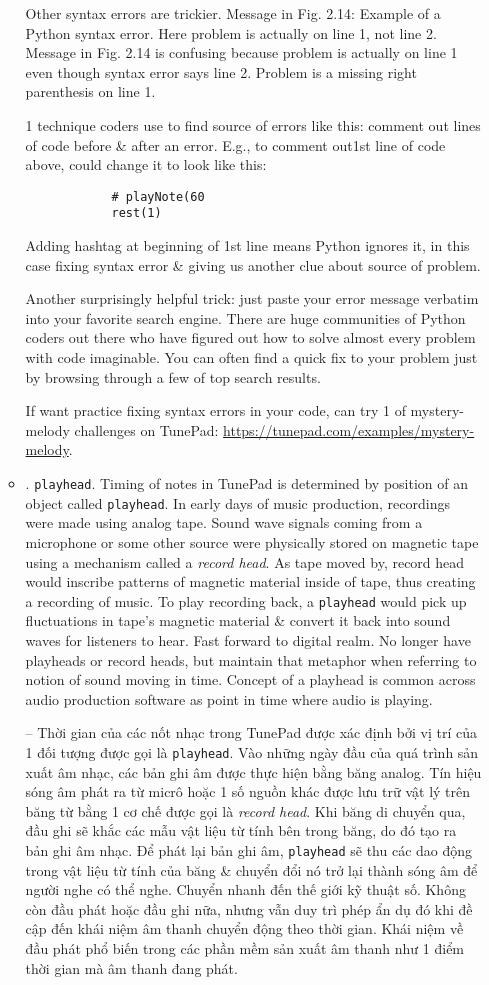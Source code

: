 \documentclass{article}
\begin{document}
\begin{itemize}
\begin{itemize}
		Other syntax errors are trickier. Message in {\sf Fig. 2.14: Example of a Python syntax error. Here problem is actually on line 1, not line 2.} Message in Fig. 2.14 is confusing because problem is actually on line 1 even though syntax error says line 2. Problem is a missing right parenthesis on line 1.
		
		1 technique coders use to find source of errors like this: comment out lines of code before \& after an error. E.g., to comment out1st line of code above, could change it to look like this:
		\begin{verbatim}
			# playNote(60
			rest(1)
		\end{verbatim}
		Adding hashtag at beginning of 1st line means Python ignores it, in this case fixing syntax error \& giving us another clue about source of problem.
		
		Another surprisingly helpful trick: just paste your error message verbatim into your favorite search engine. There are huge communities of Python coders out there who have figured out how to solve almost every problem with code imaginable. You can often find a quick fix to your problem just by browsing through a few of top search results.
		
		If want practice fixing syntax errors in your code, can try 1 of mystery-melody challenges on TunePad: \url{https://tunepad.com/examples/mystery-melody}.
		\item {. {\tt playhead}.} Timing of notes in TunePad is determined by position of an object called {\tt playhead}. In early days of music production, recordings were made using analog tape. Sound wave signals coming from a microphone or some other source were physically stored on magnetic tape using a mechanism called a {\it record head}. As tape moved by, record head would inscribe patterns of magnetic material inside of tape, thus creating a recording of music. To play recording back, a {\tt playhead} would pick up fluctuations in tape's magnetic material \& convert it back into sound waves for listeners to hear. Fast forward to digital realm. No longer have playheads or record heads, but maintain that metaphor when referring to notion of sound moving in time. Concept of a playhead is common across audio production software as point in time where audio is playing.
		
		-- Thời gian của các nốt nhạc trong TunePad được xác định bởi vị trí của 1 đối tượng được gọi là {\tt playhead}. Vào những ngày đầu của quá trình sản xuất âm nhạc, các bản ghi âm được thực hiện bằng băng analog. Tín hiệu sóng âm phát ra từ micrô hoặc 1 số nguồn khác được lưu trữ vật lý trên băng từ bằng 1 cơ chế được gọi là {\it record head}. Khi băng di chuyển qua, đầu ghi sẽ khắc các mẫu vật liệu từ tính bên trong băng, do đó tạo ra bản ghi âm nhạc. Để phát lại bản ghi âm, {\tt playhead} sẽ thu các dao động trong vật liệu từ tính của băng \& chuyển đổi nó trở lại thành sóng âm để người nghe có thể nghe. Chuyển nhanh đến thế giới kỹ thuật số. Không còn đầu phát hoặc đầu ghi nữa, nhưng vẫn duy trì phép ẩn dụ đó khi đề cập đến khái niệm âm thanh chuyển động theo thời gian. Khái niệm về đầu phát phổ biến trong các phần mềm sản xuất âm thanh như 1 điểm thời gian mà âm thanh đang phát.
		

\end{itemize}
\end{itemize}
\end{document}
